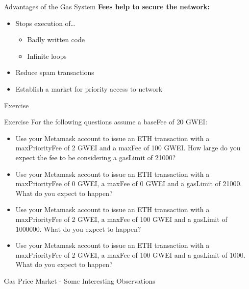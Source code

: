 \documentclass[handout]{beamer}
\begin{document}
\begin{frame}{Advantages of the Gas System}
	\textbf{Fees help to secure the network:}
	\begin{itemize}
		\item Stops execution of…
		\begin{itemize}
			\item Badly written code
			\item Infinite loops
		\end{itemize}
		\item Reduce spam transactions
		\item Establish a market for priority access to network
	\end{itemize}
\end{frame}	
\begin{frame}{Exercise}
	\begin{exercise}{Exercise}
	For the following questions assume a baseFee of 20 GWEI:
	\begin{itemize}
		\item Use your Metamask account to issue an ETH transaction with a maxPriorityFee of 2 GWEI and a maxFee of 100 GWEI. How large do you expect the fee to be considering a gasLimit of 21000?
		\item Use your Metamask account to issue an ETH transaction with a maxPriorityFee of 0 GWEI, a maxFee of 0 GWEI and a gasLimit of 21000. What do you expect to happen?
		\item Use your Metamask account to issue an ETH transaction with a maxPriorityFee of 2 GWEI, a maxFee of 100 GWEI and a gasLimit of 1000000. What do you expect to happen?
		\item Use your Metamask account to issue an ETH transaction with a maxPriorityFee of 2 GWEI, a maxFee of 100 GWEI and a gasLimit of 1000. What do you expect to happen?
	\end{itemize}
	\end{exercise}
\end{frame}

\begin{frame}{Gas Price Market - Some Interesting Observations}
	\begin{center}
	\begin{tikzpicture}
		
	\end{tikzpicture}
	\end{center}
\end{frame}
\end{document}
